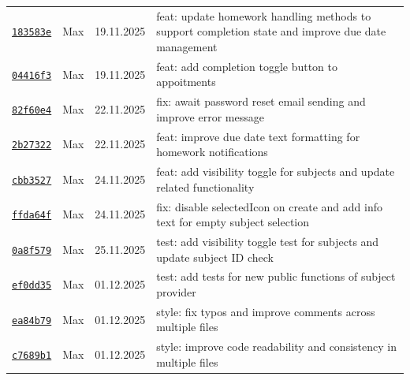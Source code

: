 \documentclass{article}%
\begin{document}
\begin{longtable}{l l l p{12cm}}
\href{https://github.com/scriptor1000/homeworks/pull/15/commits/183583e5c8f2c64d452170818e4d9dbc5672b309}{\underline{\texttt{183583e}}}&Max&19.11.2025&feat: update homework handling methods to support completion state and improve due date management\\%
\href{https://github.com/scriptor1000/homeworks/pull/15/commits/04416f3ac6118eb206fddfb93b766cb2ce2cb18b}{\underline{\texttt{04416f3}}}&Max&19.11.2025&feat: add completion toggle button to appoitments\\%
\href{https://github.com/scriptor1000/homeworks/pull/15/commits/82f60e4849323f1edae5b94a67c56d8b8ebc19ba}{\underline{\texttt{82f60e4}}}&Max&22.11.2025&fix: await password reset email sending and improve error message\\%
\href{https://github.com/scriptor1000/homeworks/pull/15/commits/2b2732285b53c2cc2153c7666c7b8e4e278f79f6}{\underline{\texttt{2b27322}}}&Max&22.11.2025&feat: improve due date text formatting for homework notifications\\%
\href{https://github.com/scriptor1000/homeworks/pull/15/commits/cbb35278190f67b0c9b70827b28f7c84d72f9ebf}{\underline{\texttt{cbb3527}}}&Max&24.11.2025&feat: add visibility toggle for subjects and update related functionality\\%
\href{https://github.com/scriptor1000/homeworks/pull/15/commits/ffda64f17c0f80f172b80286e5b1b51e246aec41}{\underline{\texttt{ffda64f}}}&Max&24.11.2025&fix: disable selectedIcon on create and add info text for empty subject selection\\%
\href{https://github.com/scriptor1000/homeworks/pull/15/commits/0a8f579e7603c9c5cba2374fcd4cb7537cd4c8ab}{\underline{\texttt{0a8f579}}}&Max&25.11.2025&test: add visibility toggle test for subjects and update subject ID check\\%
\href{https://github.com/scriptor1000/homeworks/pull/15/commits/ef0dd3516a83a0ef4713f3759b71ec5531839258}{\underline{\texttt{ef0dd35}}}&Max&01.12.2025&test: add tests for new public functions of subject provider\\%
\href{https://github.com/scriptor1000/homeworks/pull/15/commits/ea84b797eed300f5ac8b8fb56c06de891420c50b}{\underline{\texttt{ea84b79}}}&Max&01.12.2025&style: fix typos and improve comments across multiple files\\%
\href{https://github.com/scriptor1000/homeworks/pull/15/commits/c7689b1791d57859d7fda4bcdb54fae579812b66}{\underline{\texttt{c7689b1}}}&Max&01.12.2025&style: improve code readability and consistency in multiple files\\%

\end{longtable}
\end{document}
